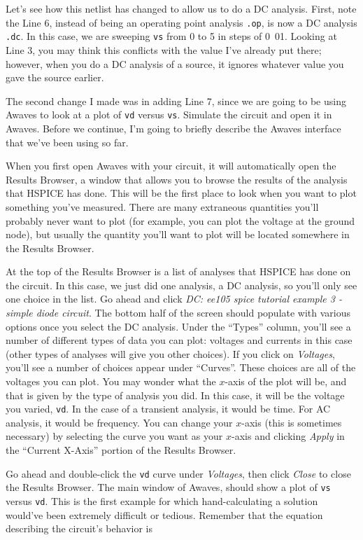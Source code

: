 \documentclass{article}
\begin{document}
Let's see how this netlist has changed to allow us to do a DC analysis. First, note the Line 6, instead of being an operating point analysis \verb|.op|, is now a DC analysis \verb|.dc|. In this case, we are sweeping \verb|vs| from \unit{0}{\volt} to \unit{5}{\volt} in steps of \unit{0.01}{\volt}. Looking at Line 3, you may think this conflicts with the value I've already put there; however, when you do a DC analysis of a source, it ignores whatever value you gave the source earlier.

The second change I made was in adding Line 7, since we are going to be using Awaves to look at a plot of \verb|vd| versus \verb|vs|. Simulate the circuit and open it in Awaves. Before we continue, I'm going to briefly describe the Awaves interface that we've been using so far.

When you first open Awaves with your circuit, it will automatically open the Results Browser, a window that allows you to browse the results of the analysis that HSPICE has done. This will be the first place to look when you want to plot something you've measured. There are many extraneous quantities you'll probably never want to plot (for example, you can plot the voltage at the ground node), but usually the quantity you'll want to plot will be located somewhere in the Results Browser.

At the top of the Results Browser is a list of analyses that HSPICE has done on the circuit. In this case, we just did one analysis, a DC analysis, so you'll only see one choice in the list. Go ahead and click \textit{DC: ee105 spice tutorial example 3 - simple diode circuit}. The bottom half of the screen should populate with various options once you select the DC analysis. Under the ``Types'' column, you'll see a number of different types of data you can plot: voltages and currents in this case (other types of analyses will give you other choices). If you click on \textit{Voltages}, you'll see a number of choices appear under ``Curves''. These choices are all of the voltages you can plot. You may wonder what the $x$-axis of the plot will be, and that is given by the type of analysis you did. In this case, it will be the voltage you varied, \verb|vd|. In the case of a transient analysis, it would be time. For AC analysis, it would be frequency. You can change your $x$-axis (this is sometimes necessary) by selecting the curve you want as your $x$-axis and clicking \textit{Apply} in the ``Current X-Axis'' portion of the Results Browser.

Go ahead and double-click the \verb|vd| curve under \textit{Voltages}, then click \textit{Close} to close the Results Browser. The main window of Awaves, should show a plot of \verb|vs| versus \verb|vd|. This is the first example for which hand-calculating a solution would've been extremely difficult or tedious. Remember that the equation describing the circuit's behavior is
\end{document}
